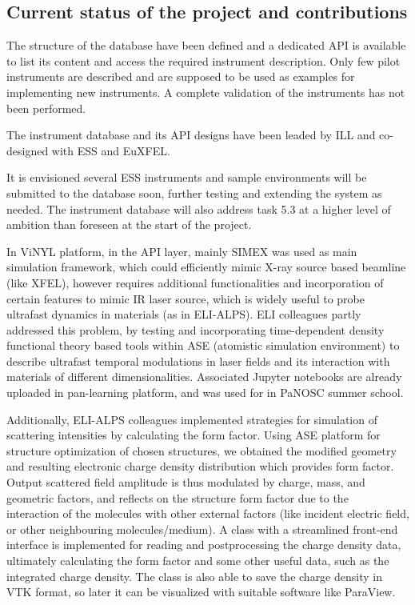 \documentclass[11pt, a4paper]{article}
\begin{document}
\subsection{Current status of the project and contributions}
The structure of the database have been defined and a dedicated API is available to list its content and access the required instrument description.
Only few pilot instruments are described and are supposed to be used as examples for implementing new instruments.
A complete validation of the instruments has not been performed.

The instrument database and its API designs have been leaded by ILL and co-designed with ESS and EuXFEL.

It is envisioned several ESS instruments and sample environments will be submitted to the database soon, further testing and extending the system as needed. The instrument database will also address task 5.3 at a higher level of ambition than foreseen at the start of the project. 

In ViNYL platform, in the API layer, mainly SIMEX was used as main simulation framework, which could efficiently mimic X-ray source based beamline  (like XFEL), however requires additional functionalities and incorporation of certain features to mimic IR laser source, which is widely useful to probe ultrafast dynamics in materials (as in ELI-ALPS).  ELI colleagues partly addressed this problem, by testing and incorporating time-dependent density functional theory based tools within ASE (atomistic simulation environment) to describe ultrafast temporal modulations in laser fields and its interaction with materials of different dimensionalities. Associated Jupyter notebooks are already uploaded in pan-learning platform, and was used for in PaNOSC summer school. 

Additionally, ELI-ALPS colleagues implemented strategies for simulation of scattering intensities by calculating the form factor. Using ASE platform for structure optimization of chosen structures, we obtained the modified geometry and resulting electronic charge density distribution which provides form factor. Output scattered field amplitude is thus modulated by charge, mass, and geometric factors, and reflects on the structure form factor due to the  interaction of the molecules with other external factors (like incident electric field, or other neighbouring molecules/medium). A class with a streamlined front-end interface is implemented for reading and postprocessing the charge density data, ultimately calculating the form factor and some other useful data, such as the integrated charge density. The class is also able to save the charge density in VTK format, so later it can be visualized with suitable software like ParaView. 
\end{document}
